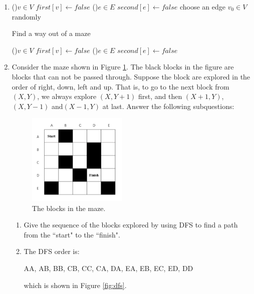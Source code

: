 \documentclass[12pt,a4paper]{article}
\makeatletter
\newtheorem*{solution}{Solution}
\theoremstyle{definition}
\renewenvironment{solution}[1][Solution] {\par\pushQED{\qed}\normalfont\topsep6\p@\@plus6\p@\relax\trivlist\item[\hskip\labelsep\bfseries#1\@addpunct{.}]\ignorespaces}{\popQED\endtrivlist\@endpefalse} \makeatother
\makeatother
\begin{document}
\begin{enumerate}
\begin{solution}
\begin{algorithm}[!htbp]
        \label{alg:td}
        \BlankLine
        \ForEach(){$v\in V$}{
            $first[v]\leftarrow false$\;
        }
        \ForEach(){$e\in E$}{
            $second[e]\leftarrow false$\;
        }
        choose an edge $v_0\in V$ randomly\;
        \;
    \end{algorithm}
    \begin{algorithm}[!htbp]
        \caption{Find a way out of a maze}
        \label{alg:maze}
        \BlankLine
        \ForEach(){$v\in V$}{
            $first[v]\leftarrow false$\;
        }
        \ForEach(){$e\in E$}{
            $second[e]\leftarrow false$\;
        }
        \;
    \end{algorithm}
    \end{solution}

    \item Consider the maze shown in Figure \ref{Fig-Maze}. The black blocks in the figure are blocks that can not be passed through. Suppose the block are explored in the order of right, down, left and up. That is, to go to the next block from $(X,Y)$, we always explore $(X,Y+1)$ first, and then $(X+1,Y)$,$(X,Y-1)$ and$(X-1,Y)$ at last. Answer the following subquestions:
    \begin{figure}[!htbp]
        \centering
        \includegraphics[width=0.45\textwidth]{Fig-Maze.pdf}
        \caption{The blocks in the maze.}
        \label{Fig-Maze}
    \end{figure}
    \begin{enumerate}
        \item Give the sequence of the blocks explored by using DFS to find a path from the ``start" to the ``finish".
        \begin{solution}
            The DFS order is:
            \begin{tcolorbox}
                AA, AB, BB, CB, CC, CA, DA, EA, EB, EC, ED, DD
            \end{tcolorbox}
            which is shown in Figure \ref{fig:dfs}.


\end{solution}
\end{enumerate}
\end{enumerate}
\end{document}
